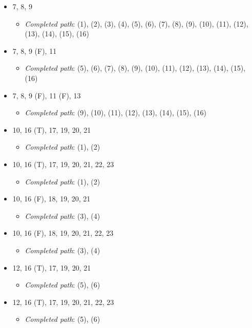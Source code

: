\documentclass{article}
\newcommand{\completedpath}{\textit{Completed path}}
\begin{document}
\begin{itemize}
    \item 7, 8, 9
    \begin{itemize}
        \item \completedpath: (1), (2), (3), (4), (5), (6), (7), (8), (9), (10), (11), (12), (13), (14), (15), (16)
    \end{itemize}
    \item 7, 8, 9 (F), 11
    \begin{itemize}
        \item \completedpath: (5), (6), (7), (8), (9), (10), (11), (12), (13), (14), (15), (16)
    \end{itemize}
    \item 7, 8, 9 (F), 11 (F), 13
    \begin{itemize}
        \item \completedpath: (9), (10), (11), (12), (13), (14), (15), (16)
    \end{itemize}
    \item 10, 16 (T), 17, 19, 20, 21
    \begin{itemize}
        \item \completedpath: (1), (2)
    \end{itemize}
    \item 10, 16 (T), 17, 19, 20, 21, 22, 23
    \begin{itemize}
        \item \completedpath: (1), (2)
    \end{itemize}
    \item 10, 16 (F), 18, 19, 20, 21
    \begin{itemize}
        \item \completedpath: (3), (4)
    \end{itemize}
    \item 10, 16 (F), 18, 19, 20, 21, 22, 23
    \begin{itemize}
        \item \completedpath: (3), (4)
    \end{itemize}
    \item 12, 16 (T), 17, 19, 20, 21
    \begin{itemize}
        \item \completedpath: (5), (6)
    \end{itemize}
    \item 12, 16 (T), 17, 19, 20, 21, 22, 23
    \begin{itemize}
        \item \completedpath: (5), (6)

\end{itemize}
\end{itemize}
\end{document}
